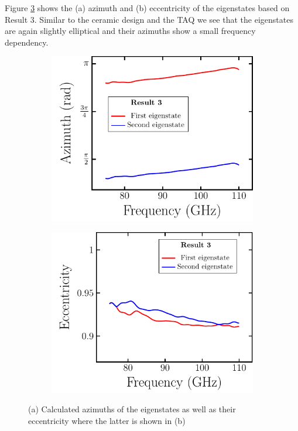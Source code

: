 Figure \ref{fig:polymer_eigenstate_params} shows the (a) azimuth and (b) eccentricity of the eigenstates based on Result 3. Similar to the ceramic design and the TAQ we see that the eigenstates are again slightly elliptical and their azimuths show a small frequency dependency.

\begin{figure}[H]
    \begin{subfigure}[b]{.5\linewidth}
    \caption{}\label{}
    \centering\includegraphics[scale=0.6]{images/results/plots/polymer/eigenstate_params_a.pdf}
    \end{subfigure}%
    \begin{subfigure}[b]{.5\linewidth}
    \caption{}\label{}
    \centering\includegraphics[scale=0.6]{images/results/plots/polymer/eigenstate_params_b.pdf}
    \end{subfigure}
    \caption{(a) Calculated azimuths of the eigenstates as well as their eccentricity where the latter is shown in (b)}
    \label{fig:polymer_eigenstate_params}
\end{figure}

